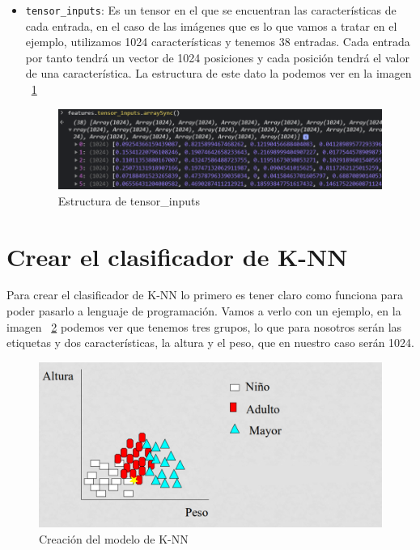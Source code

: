 \documentclass[a4paper, 12pt]{book}
\begin{document}
\begin{itemize}
	\item \texttt{tensor\_inputs}: Es un tensor en el que se encuentran las características de cada entrada, en el caso de las imágenes que es lo que vamos a tratar en el ejemplo, utilizamos 1024 características y tenemos 38 entradas. Cada entrada por tanto tendrá un vector de 1024 posiciones y cada posición tendrá el valor de una característica. La estructura de este dato la podemos ver en la imagen ~\ref{fig:tensorinputs}

\begin{figure}
	\centering
	\includegraphics[width=12cm, keepaspectratio]{img/tensorinputs}
	\caption{Estructura de tensor\_inputs}				
	\label{fig:tensorinputs}
\end{figure}


\end{itemize}

\section{Crear el clasificador de K-NN} 
\label{sec:knn}

Para crear el clasificador de K-NN lo primero es tener claro como funciona para poder pasarlo a lenguaje de programación. Vamos a verlo con un ejemplo, en  la imagen ~\ref{fig:ejemploknn} podemos ver que tenemos tres grupos, lo que para nosotros serán las etiquetas y dos características, la altura y el peso, que en nuestro caso serán 1024. 

\begin{figure}
	\centering
	\includegraphics[width=12cm, keepaspectratio]{img/ejemploknn}
	\caption{Creación del modelo de K-NN}				
	\label{fig:ejemploknn}
\end{figure}
\end{document}
